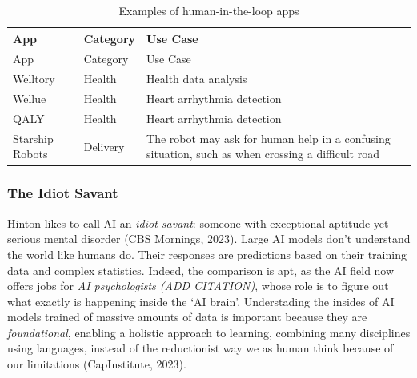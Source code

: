 \documentclass[
  letterpaper,
  DIV=11,
  numbers=noendperiod]{scrartcl}
\begin{document}
\begin{longtable}[]{@{}
  >{\raggedright\arraybackslash}p{}
  >{\raggedright\arraybackslash}p{}
  >{\raggedright\arraybackslash}p{}@{}}
\caption{Examples of human-in-the-loop apps}\tabularnewline
\toprule\noalign{}
\begin{minipage}[b]{\linewidth}\raggedright
App
\end{minipage} & \begin{minipage}[b]{\linewidth}\raggedright
Category
\end{minipage} & \begin{minipage}[b]{\linewidth}\raggedright
Use Case
\end{minipage} \\
\midrule\noalign{}
\endfirsthead
\toprule\noalign{}
\begin{minipage}[b]{\linewidth}\raggedright
App
\end{minipage} & \begin{minipage}[b]{\linewidth}\raggedright
Category
\end{minipage} & \begin{minipage}[b]{\linewidth}\raggedright
Use Case
\end{minipage} \\
\midrule\noalign{}
\endhead
\bottomrule\noalign{}
\endlastfoot
Welltory & Health & Health data analysis \\
Wellue & Health & Heart arrhythmia detection \\
QALY & Health & Heart arrhythmia detection \\
Starship Robots & Delivery & The robot may ask for human help in a
confusing situation, such as when crossing a difficult road \\
\end{longtable}

\subsubsection{The Idiot Savant}\label{the-idiot-savant}

Hinton likes to call AI an \emph{idiot savant}: someone with exceptional
aptitude yet serious mental disorder (CBS Mornings, 2023). Large AI
models don't understand the world like humans do. Their responses are
predictions based on their training data and complex statistics. Indeed,
the comparison is apt, as the AI field now offers jobs for \emph{AI
psychologists (ADD CITATION)}, whose role is to figure out what exactly
is happening inside the `AI brain'. Understading the insides of AI
models trained of massive amounts of data is important because they are
\emph{foundational}, enabling a holistic approach to learning, combining
many disciplines using languages, instead of the reductionist way we as
human think because of our limitations (CapInstitute, 2023).
\end{document}
